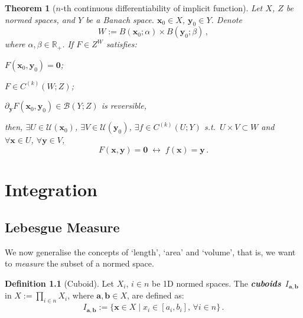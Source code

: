 \documentclass[openany]{book}
\theoremstyle{plain}
\newtheorem{theorem}{Theorem}[section] %
\theoremstyle{definition}
\newtheorem{definition}{Definition}[section] %
\newcommand*{\bv}{\boldsymbol} %
\newcommand*{\IFF}{\;\leftrightarrow\;} %
\newcommand{\emphbf}[1]{\emph{\textbf{#1}}}
\begin{document}
\begin{theorem}[$n$-th continuous differentiability of implicit function]
	\label{theorem: nth continuous differentiability of implicit function}
	Let $X$, $Z$ be normed spaces, and $Y$ be a Banach space.
	$\bv x_0 \in X$, $\bv y_0 \in Y$. Denote
	\begin{equation*}
		W := B(\bv x_0; \alpha) \times B(\bv y_0; \beta)\,,
	\end{equation*}
	where $\alpha, \beta \in \mathbb R_+$.
	If $F \in Z^W$ satisfies:
	\begin{conditionlist}[label=\alph*)]
		\item $F(\bv x_0, \bv y_0) = \bv 0$;
		\item $F \in C^{(k)}(W; Z)$; 
		\item $\partial_{\bv y} F(\bv x_0, \bv y_0) \in \mathcal B(Y; Z)$ is reversible,
	\end{conditionlist}
	then, $\exists U \in \mathscr U(\bv x_0)$, $\exists V \in \mathscr U(\bv y_0)$, $\exists f \in C^{(k)}(U; Y)$ s.t.\ $U \times V \subset W$ and $\forall \bv x \in U$, $\forall \bv y \in V$, 
	\begin{equation*}
		F(\bv x, \bv y) = \bv 0
		\IFF
		f(\bv x) = \bv y\,.
	\end{equation*}
\end{theorem}





\chapter{Integration}

\section{Lebesgue Measure}

We now generalise the concepts of `length', `area' and `volume', that is, we want to \emph{measure} the subset of a normed space.


\begin{definition}[Cuboid]
	Let $X_i$, $i \in n$ be 1D normed spaces. 
	The \emphbf{cuboids}~$I_{\bv a, \bv b}$ in $X := \prod_{i \in n} X_i$, where $\bv a, \bv b \in X$, are defined as:
	\begin{equation*}
		I_{\bv a, \bv b} 
			:= \{\bv x \in X \mid x_i \in  [a_i, b_i],\, \forall i \in n\}\,.
	\end{equation*}
\end{definition}
\end{document}
